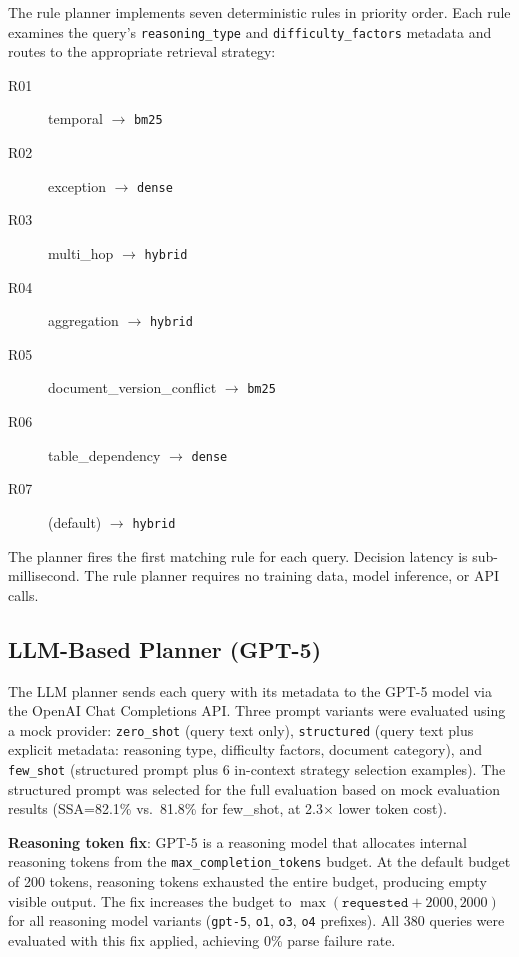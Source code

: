The rule planner implements seven deterministic rules in priority order. Each rule examines the query's \texttt{reasoning\_type} and \texttt{difficulty\_factors} metadata and routes to the appropriate retrieval strategy:

\begin{description}
    \item[R01] temporal $\rightarrow$ \texttt{bm25}
    \item[R02] exception $\rightarrow$ \texttt{dense}
    \item[R03] multi\_hop $\rightarrow$ \texttt{hybrid}
    \item[R04] aggregation $\rightarrow$ \texttt{hybrid}
    \item[R05] document\_version\_conflict $\rightarrow$ \texttt{bm25}
    \item[R06] table\_dependency $\rightarrow$ \texttt{dense}
    \item[R07] (default) $\rightarrow$ \texttt{hybrid}
\end{description}

The planner fires the first matching rule for each query. Decision latency is sub-millisecond. The rule planner requires no training data, model inference, or API calls.

\subsection{LLM-Based Planner (GPT-5)}

The LLM planner sends each query with its metadata to the GPT-5 model via the OpenAI Chat Completions API. Three prompt variants were evaluated using a mock provider: \texttt{zero\_shot} (query text only), \texttt{structured} (query text plus explicit metadata: reasoning type, difficulty factors, document category), and \texttt{few\_shot} (structured prompt plus 6 in-context strategy selection examples). The structured prompt was selected for the full evaluation based on mock evaluation results (SSA=82.1\% vs.\ 81.8\% for few\_shot, at 2.3$\times$ lower token cost).

\noindent\textbf{Reasoning token fix}: GPT-5 is a reasoning model that allocates internal reasoning tokens from the \texttt{max\_completion\_tokens} budget. At the default budget of 200 tokens, reasoning tokens exhausted the entire budget, producing empty visible output. The fix increases the budget to $\max(\texttt{requested} + 2000, 2000)$ for all reasoning model variants (\texttt{gpt-5}, \texttt{o1}, \texttt{o3}, \texttt{o4} prefixes). All 380 queries were evaluated with this fix applied, achieving 0\% parse failure rate.


